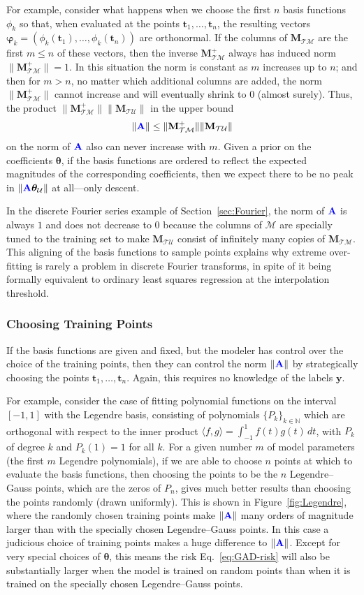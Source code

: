 \documentclass[twocolumn,aps,prx,superscriptaddress,10pt]{revtex4-2}
\newcommand{\by}{\bm{y}}
\newcommand{\bt}{\bm{t}}
\newcommand{\0}{\bm{0}}
\newcommand{\bphi}{\boldsymbol{\varphi}}
\newcommand{\btheta}{\boldsymbol{\theta}}
\newcommand{\M}{\mathcal{M}} %
\newcommand{\T}{\mathcal{T}} %
\newcommand{\U}{\mathcal{U}} %
\newcommand{\bbA}{{\color{blue}{\mathbf{A}}}}  %
\newcommand{\bbM}{\mathbf{M}}
\newcommand{\MTM}{\bbM_{\T\M}}
\newcommand{\MTU}{\bbM_{\T\U}}
\newcommand{\N}{\mathbb{N}}
\begin{document}
For example, consider what happens when we choose the first $n$ basis functions $\phi_k$ so that, when evaluated at the points $\bt_1, \dots, \bt_n$, the resulting vectors $\bphi_k = (\phi_k(\bt_1), \dots, \phi_k(\bt_n))$ are orthonormal. 
If the columns of $\MTM$ are the first $m \le n$ of these vectors, then the inverse $\MTM^+$ always has induced norm $\|\MTM^+\| = 1$.  In this situation the norm is constant as $m$ increases up to $n$; and then for $m>n$, no matter which additional columns are added, the norm $\|\MTM^+\|$ cannot increase and will eventually shrink to $0$ (almost surely).  
Thus, the product $\|\MTM^+\| \|\MTU\|$ in the upper bound 
\[
\|\bbA\| \le \|\MTM^+\| \|\MTU\|
\]
on the norm of $\bbA$ also can never increase with $m$.  Given a prior on the coefficients $\btheta$, if the basis functions are ordered to reflect the expected magnitudes of the corresponding coefficients, then we expect there to be no peak in $\|\bbA\btheta_\U\|$ at all---only descent.

In the discrete Fourier series example of Section~\ref{sec:Fourier}, the norm of $\bbA$ is always $1$ and does not decrease to $0$ because the columns of $\M$ are specially tuned to the training set to make $\MTU$ consist of infinitely many copies of $\MTM$.
This aligning of the basis functions to sample points explains why extreme over-fitting is rarely a problem in discrete Fourier transforms, in spite of it being formally equivalent to ordinary least squares regression at the interpolation threshold.

\subsubsection{Choosing Training Points}
If the basis functions are given and fixed, but the modeler has control over the choice of the training points, then they can control the norm $\|\bbA\|$ by strategically choosing the points $\bt_1, \dots, \bt_n$.  Again, this requires no knowledge of the labels $\by$.

For example, consider the case of fitting polynomial functions on the interval $[-1,1]$ with the Legendre basis, consisting of polynomials  $\{P_k\}_{k\in \N}$ which are orthogonal with respect to the inner product $\langle f, g \rangle = \int_{-1}^1 f(t) g(t) \, dt$, with  $P_k$ of degree $k$ and $P_k(1)=1$ for all $k$.  For a given number $m$ of model parameters (the first $m$ Legendre polynomials), if we are able to choose $n$ points at which to evaluate the basis functions, then choosing the points to be the $n$ Legendre--Gauss points, which are the zeros of $P_n$, gives much better results than choosing the points randomly (drawn uniformly).  This is shown in Figure~\ref{fig:Legendre}, where the randomly chosen training points make $\|\bbA\|$ many orders of magnitude larger than with the specially chosen Legendre--Gauss points.  
In this case a judicious choice of training points makes a huge difference to $\|\bbA\|$.  Except for very special choices of $\btheta$, this means the risk Eq.~\eqref{eq:GAD-risk} will also be substantially larger when the model is trained on random points than when it is trained on the specially chosen Legendre--Gauss points.
\end{document}
